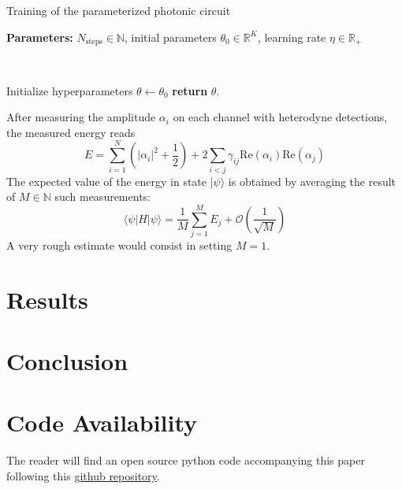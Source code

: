\documentclass[reprint, amsmath, amssymb, aps]{revtex4-2}
\begin{document}
    \begin{algorithm}
        \caption{Training of the parameterized photonic circuit}\label{alg:training}
        \textbf{Parameters:} $N_\text{steps}\in\mathbb N$, initial parameters $\theta_0\in\mathbb R^K$, learning rate $\eta\in\mathbb R_+$

        \

        Initialize hyperparameters $\theta \gets \theta_0$\;
        \textbf{return} $\theta$.
    \end{algorithm}

    After measuring the amplitude $\alpha_i$ on each channel with heterodyne detections, the measured energy reads
    \begin{equation}
    \label{eq:energy_coherent}
        E = \sum_{i=1}^N\left(|\alpha_i|^2+\frac{1}{2}\right) + 2\sum_{i<j}\gamma_{ij}\text{Re}(\alpha_i)\text{Re}(\alpha_j)
    \end{equation}
    The expected value of the energy in state $|\psi\rangle$ is obtained by averaging the result of $M\in\mathbb N$ such measurements:
    \begin{equation}
        \langle\psi|H|\psi\rangle = \frac{1}{M}\sum_{j=1}^M E_j + \mathcal O\left(\frac{1}{\sqrt M}\right)
    \end{equation}
    A very rough estimate would consist in setting $M=1$.

\section{Results}
\section{Conclusion}

\begin{acknowledgments}

\end{acknowledgments}

\section*{Code Availability}

The reader will find an open source python code accompanying this paper following this \href{https://github.com/MatthieuSarkis/qdo}{github repository}.

\appendix

\nocite{*}


\end{document}
